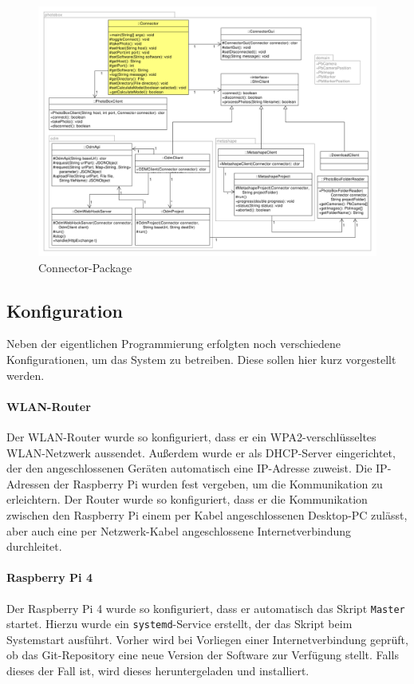 \documentclass[./00PhotoBox.tex]{subfiles}
\begin{document}
\begin{figure}
    \centering
    \includegraphics[width=1\textwidth]{./img/uml/uml_connector_classdiagramm.pdf}
    \caption{Connector-Package}
    \label{img:uml_connector}
\end{figure}

\subsection{Konfiguration}
Neben der eigentlichen Programmierung erfolgten noch verschiedene Konfigurationen, um das System zu betreiben. Diese sollen hier kurz vorgestellt werden.

\paragraph{WLAN-Router}
Der WLAN-Router wurde so konfiguriert, dass er ein WPA2-ver\-schlüssel\-tes WLAN-Netzwerk aussendet. Außerdem wurde er als DHCP-Server eingerichtet, der den angeschlossenen Geräten automatisch eine IP-Adresse zuweist. Die IP-Adressen der Raspberry Pi wurden fest vergeben, um die Kommunikation zu erleichtern. Der Router wurde so konfiguriert, dass er die Kommunikation zwischen den Raspberry Pi einem per Kabel angeschlossenen Desktop-PC zulässt, aber auch eine per Netzwerk-Kabel angeschlossene Internetverbindung durchleitet.

\paragraph{Raspberry Pi 4}
Der Raspberry Pi 4 wurde so konfiguriert, dass er automatisch das Skript \texttt{Master} startet. Hierzu wurde ein \texttt{systemd}-Service erstellt, der das Skript beim Systemstart ausführt. Vorher wird bei Vorliegen einer Internetverbindung geprüft, ob das Git-Repository eine neue Version der Software zur Verfügung stellt. Falls dieses der Fall ist, wird dieses heruntergeladen und installiert.
\end{document}
